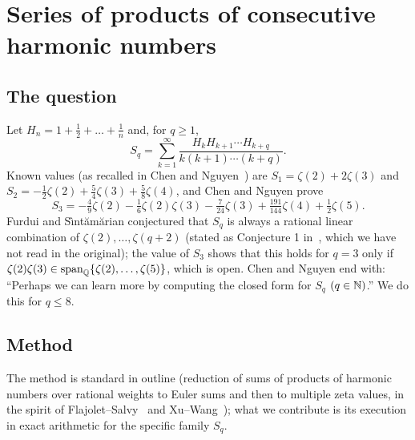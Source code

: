 \section{Series of products of consecutive harmonic numbers}\label{sec:harmonic}

\subsection{The question}
Let $H_n=1+\frac12+\dots+\frac1n$ and, for $q\ge1$,
\[
S_q=\sum_{k=1}^\infty\frac{H_kH_{k+1}\cdots H_{k+q}}{k(k+1)\cdots(k+q)} .
\]
Known values (as recalled in Chen and Nguyen~\cite{CN}) are $S_1=\zeta(2)+2\zeta(3)$ and $S_2=-\tfrac12\zeta(2)+\tfrac54\zeta(3)+\tfrac58\zeta(4)$, and Chen and Nguyen prove
\[
S_3=-\tfrac49\zeta(2)-\tfrac16\zeta(2)\zeta(3)-\tfrac7{24}\zeta(3)+\tfrac{191}{144}\zeta(4)+\tfrac12\zeta(5).
\]
Furdui and S\^{\i}nt\u{a}m\u{a}rian conjectured that $S_q$ is always a rational linear combination of $\zeta(2),\dots,\zeta(q+2)$ (stated as Conjecture 1 in~\cite{CN}, which we have not read in the original); the value of $S_3$ shows that this holds for $q=3$ only if $\zeta(2)\zeta(3)\in\operatorname{span}_{\mathbb{Q}}\{\zeta(2),\dots,\zeta(5)\}$, which is open. Chen and Nguyen end with: ``Perhaps we can learn more by computing the closed form for $S_q$ $(q\in\mathbb{N})$.'' We do this for $q\le 8$.

\subsection{Method}
The method is standard in outline (reduction of sums of products of harmonic numbers over rational weights to Euler sums and then to multiple zeta values, in the spirit of Flajolet--Salvy~\cite{FS} and Xu--Wang~\cite{XW}); what we contribute is its execution in exact arithmetic for the specific family $S_q$.

